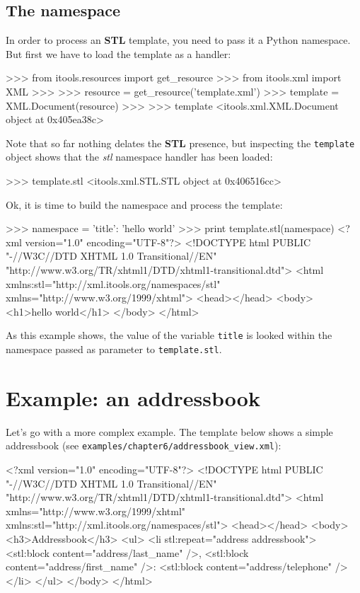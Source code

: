 \subsection{The namespace}

In order to process an {\bf STL} template, you need to pass it a Python
namespace. But first we have to load the template as a handler:

\begin{code}
    >>> from itools.resources import get_resource
    >>> from itools.xml import XML
    >>>   
    >>> resource = get_resource('template.xml')
    >>> template = XML.Document(resource)
    >>> 
    >>> template
    <itools.xml.XML.Document object at 0x405ea38c>
\end{code}

Note that so far nothing delates the {\bf STL} presence, but inspecting
the {\tt template} object shows that the {\em stl} namespace handler has
been loaded:

\begin{code}
    >>> template.stl
    <itools.xml.STL.STL object at 0x406516cc>
\end{code}

Ok, it is time to build the namespace and process the template:

\begin{code}
    >>> namespace = {'title': 'hello world'}
    >>> print template.stl(namespace)
    <?xml version="1.0" encoding="UTF-8"?>
    <!DOCTYPE html
         PUBLIC "-//W3C//DTD XHTML 1.0 Transitional//EN"
        "http://www.w3.org/TR/xhtml1/DTD/xhtml1-transitional.dtd">
    <html xmlns:stl="http://xml.itools.org/namespaces/stl"
          xmlns="http://www.w3.org/1999/xhtml">
      <head></head>
      <body>
        <h1>hello world</h1>
      </body>
    </html>
\end{code}


As this example shows, the value of the variable {\tt title} is looked within
the namespace passed as parameter to {\tt template.stl}.


\section{Example: an addressbook}

Let's go with a more complex example. The template below shows a simple
addressbook (see {\tt examples/chapter6/addressbook\_view.xml}):

\begin{code}
    <?xml version="1.0" encoding="UTF-8"?>
    <!DOCTYPE html
         PUBLIC "-//W3C//DTD XHTML 1.0 Transitional//EN"
         "http://www.w3.org/TR/xhtml1/DTD/xhtml1-transitional.dtd">
    <html xmlns="http://www.w3.org/1999/xhtml"
          xmlns:stl="http://xml.itools.org/namespaces/stl">
      <head></head>
      <body>
        <h3>Addressbook</h3>
        <ul>
          <li stl:repeat="address addressbook">
            <stl:block content="address/last_name" />,
            <stl:block content="address/first_name" />:
            <stl:block content="address/telephone" />
          </li>
        </ul>
      </body>
    </html>
\end{code}

